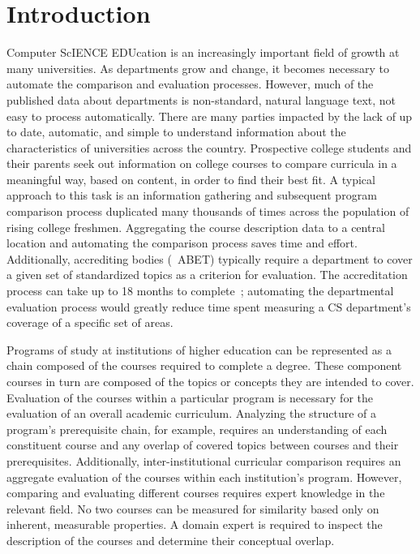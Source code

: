 \section{Introduction}
\label{sec:introduction}


Computer ScIENCE EDUcation is an increasingly important field of growth at many universities.
As departments grow and change, it becomes necessary to automate the comparison and evaluation processes.
However, much of the published data about departments is non-standard, natural language text, not easy to process automatically.
There are many parties impacted by the lack of up to date, automatic, and simple to understand information about the characteristics of universities across the country.
Prospective college students and their parents seek out information on college courses to compare curricula in a meaningful way, based on content, in order to find their best fit.
A typical approach to this task is an information gathering and subsequent program comparison process duplicated many thousands of times across the population of rising college freshmen.
Aggregating the course description data to a central location and automating the comparison process saves time and effort.
Additionally, accrediting bodies (\eg\ ABET) typically require a department to cover a given set of standardized topics as a criterion for evaluation.
The accreditation process can take up to 18 months to complete~\cite{ABET2015}; automating the departmental evaluation process would greatly reduce time spent measuring a CS department's coverage of a specific set of areas.


Programs of study at institutions of higher education can be represented as a chain composed of the courses required to complete a degree.
These component courses in turn are composed of the topics or concepts they are intended to cover.
Evaluation of the courses within a particular program is necessary for the evaluation of an overall academic curriculum.
Analyzing the structure of a program's prerequisite chain, for example, requires an understanding of each constituent course and any overlap of covered topics between courses and their prerequisites.
Additionally, inter-institutional curricular comparison requires an aggregate evaluation of the courses within each institution's program.
However, comparing and evaluating different courses requires expert knowledge in the relevant field.
No two courses can be measured for similarity based only on inherent, measurable properties.
A domain expert is required to inspect the description of the courses and determine their conceptual overlap.

